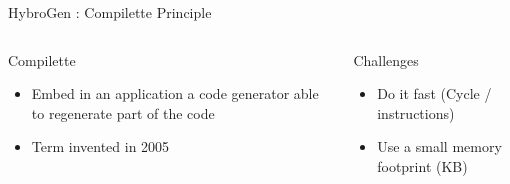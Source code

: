 \begin{Frame}{HybroGen : Compilette Principle}
 \begin{columns}[t]
  \begin{column}{\BW}
    \begin{block}{Compilette}
      \begin{itemize}
        \item Embed in an application a code generator able to
          regenerate part of the code
        \item Term invented in 2005 
      \end{itemize}
    \end{block}
  \end{column}
  \begin{column}{\BW}
    \begin{block}{Challenges}
      \begin{itemize}
      \item Do it fast (Cycle / instructions)
      \item Use a small memory footprint (KB)
      \end{itemize}
    \end{block}
  \end{column}

 \end{columns}
\end{Frame}
